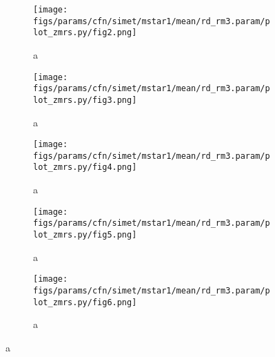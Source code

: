 \documentclass[twocolumn]{article}
\begin{document}
\begin{figure}
  \begin{subfigure}{.5\textwidth}
    \centering\texttt{[image: figs/params/cfn/simet/mstar1/mean/rd\_rm3.param/plot\_zmrs.py/fig2.png]}
    \caption{a}
  \end{subfigure}
  \begin{subfigure}{.5\textwidth}
    \centering\texttt{[image: figs/params/cfn/simet/mstar1/mean/rd\_rm3.param/plot\_zmrs.py/fig3.png]}
    \caption{a}
  \end{subfigure}
  \begin{subfigure}{.5\textwidth}
    \centering\texttt{[image: figs/params/cfn/simet/mstar1/mean/rd\_rm3.param/plot\_zmrs.py/fig4.png]}
    \caption{a}
  \end{subfigure}%
  \begin{subfigure}{.5\textwidth}
    \centering\texttt{[image: figs/params/cfn/simet/mstar1/mean/rd\_rm3.param/plot\_zmrs.py/fig5.png]}
    \caption{a}
  \end{subfigure}
  \begin{subfigure}{.5\textwidth}
    \centering\texttt{[image: figs/params/cfn/simet/mstar1/mean/rd\_rm3.param/plot\_zmrs.py/fig6.png]}
    \caption{a}
  \end{subfigure}
  
\end{figure}
\clearpage






\end{document}
